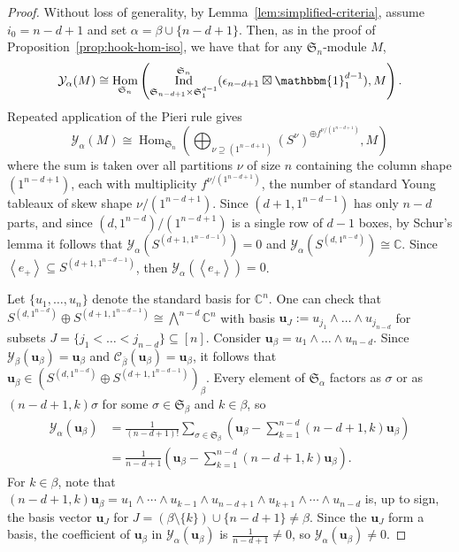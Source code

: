 \documentclass[11pt, noadjust, reqno]{amsart}
\theoremstyle{definition}
\theoremstyle{remark}
\numberwithin{equation}{section}
\newcommand{\0}{\emptyset}
\newcommand{\C}{\mathbb{C}}
\renewcommand{\S}{\mathfrak{S}}
\newcommand{\cC}{\mathcal{C}}
\newcommand{\cY}{\mathcal{Y}}
\DeclareMathOperator{\Hom}{Hom}
\DeclareMathOperator{\Ind}{Ind}
\begin{document}
\begin{proof}
    Without loss of generality, by Lemma~\ref{lem:simplified-criteria}, assume $i_0 =n-d+1$ and set $\alpha = \beta \cup \{n-d+1\}$. Then, as in the proof of Proposition~\ref{prop:hook-hom-iso}, we have that for any $\S_n$-module $M$,
    \[
    \cY_\alpha(M) \cong \Hom_{\S_n}\left(\Ind_{\S_{n-d+1} \times \S_1^{d-1}}^{\S_n}(\epsilon_{n-d+1} \boxtimes \mathbbm{1}_1^{d-1}), M\right). 
    \] 
    Repeated application of the Pieri rule gives
    \[
\cY_\alpha(M) \cong \Hom_{\S_n}\left( \bigoplus_{\nu \supseteq (1^{n-d+1})} (S^\nu)^{\oplus f^{\nu/(1^{n-d+1})}}, M \right)
    \]
    where the sum is taken over all partitions $\nu$ of size $n$ containing the column shape $(1^{n-d+1})$, each with multiplicity $f^{\nu/(1^{n-d+1})}$, the number of standard Young tableaux of skew shape $\nu/(1^{n-d+1})$. 
Since $(d+1,1^{n-d-1})$ has only $n-d$ parts, and since $(d,1^{n-d})/(1^{n-d+1})$ is a single row of $d-1$ boxes, by Schur's lemma it follows that 
$\cY_\alpha(S^{(d+1,1^{n-d-1})})=0$ and $\cY_\alpha(S^{(d,1^{n-d})})\cong \C$. 
Since $\left\langle e_+ \right\rangle \subseteq S^{(d+1,1^{n-d-1})}$, then $\cY_\alpha(\left\langle e_+ \right\rangle )=0$. 

Let $\{u_1,\ldots,u_n\}$ denote the standard basis for $\C^n$. 
One can check that $S^{(d,1^{n-d})} \oplus S^{(d+1,1^{n-d-1})} \cong \bigwedge^{n-d} \C^n$ with basis $\bm{u}_J:= u_{j_1} \wedge \dots \wedge u_{j_{n-d}}$ for subsets $J = \{j_1<\dots< j_{n-d}\} \subseteq [n]$.
Consider $\bm{u}_\beta = u_1 \wedge \dots \wedge u_{n-d}$. 
Since $\cY_\beta(\bm{u}_\beta) = \bm{u}_\beta$ and $\cC_{\overline{\beta}}(\bm{u}_\beta)= \bm{u}_\beta$, it follows that $\bm{u}_\beta \in (S^{(d,1^{n-d})} \oplus S^{(d+1,1^{n-d-1})})_\beta$. 
Every element of $\S_\alpha$ factors as $\sigma$ or as $(n-d+1,k)\sigma$ for some $\sigma \in \S_\beta$ and $k \in \beta$, so
\begin{align*}
\cY_\alpha(\bm{u}_\beta) &= \frac{1}{(n-d+1)!}\sum_{\sigma \in \S_\beta} \left(\bm{u}_\beta - \sum_{k=1}^{n-d}(n-d+1,k)\bm{u}_\beta\right)\\
&=
\frac{1}{n-d+1}\left(\bm{u}_\beta - \sum_{k=1}^{n-d}(n-d+1,k)\bm{u}_\beta\right).
\end{align*}
For $k \in \beta$, note that $(n-d+1,k)\bm{u}_\beta = u_1 \wedge \cdots \wedge u_{k-1} \wedge u_{n-d+1} \wedge u_{k+1} \wedge \cdots \wedge u_{n-d}$ is, up to sign, the basis vector $\bm{u}_J$ for $J = (\beta \setminus \{k\}) \cup \{n-d+1\} \neq \beta$.
Since the $\bm{u}_J$ form a basis, the coefficient of $\bm{u}_\beta$ in $\cY_\alpha(\bm{u}_\beta)$ is $\frac{1}{n-d+1} \neq 0$, so $\cY_\alpha(\bm{u}_\beta) \neq 0$.


\end{proof}
\end{document}
